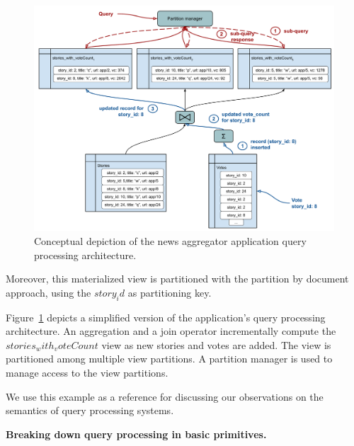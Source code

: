 \begin{figure}[t]
  \centering
    \includegraphics[width=\textwidth]{./figures/design_pattern/running_example.pdf}
    \caption{Conceptual depiction of the news aggregator application query processing architecture.}
    \label{fig:running_example}
\end{figure}

Moreover, this materialized view is partitioned with the partition by document approach, using the $story_id$ as partitioning key.

Figure~\ref{fig:running_example} depicts a simplified version of the application's query processing architecture.
An aggregation and a join operator incrementally compute the $stories_with_voteCount$ view as new stories and votes are added.
The view is partitioned among multiple view partitions.
A partition manager is used to manage access to the view partitions.

We use this example as a reference for discussing our observations on the semantics of query processing systems.

\vspace{12pt}
\noindent
\textbf{Breaking down query processing in basic primitives.}

